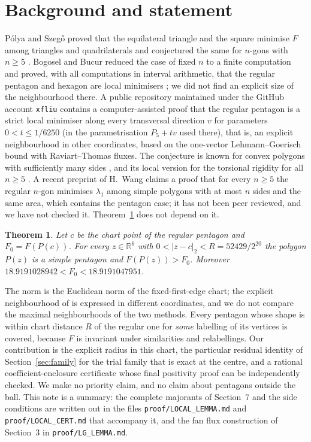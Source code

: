 \documentclass[11pt]{article}
\newtheorem{theorem}{Theorem}
\theoremstyle{remark}
\newcommand{\R}{\mathbb{R}}
\begin{document}
\section{Background and statement}
P\'olya and Szeg\H{o} proved that the equilateral triangle and the square minimise $F$ among triangles and
quadrilaterals and conjectured the same for $n$-gons with $n\ge5$ \cite{ps}. Bogosel and Bucur reduced the case of
fixed $n$ to a finite computation \cite{bb-jep} and proved, with all computations in interval arithmetic, that the
regular pentagon and hexagon are local minimisers \cite{bb-val}; we did not find an explicit size of the
neighbourhood there. A public repository maintained under the GitHub account
\texttt{xfliu} \cite{liu} contains a computer-assisted proof that the regular pentagon is a strict local minimiser
along every transversal direction $v$ for parameters $0<t\le 1/6250$ (in the parametrisation $P_5+tv$ used there),
that is, an explicit neighbourhood in other coordinates, based on the one-vector Lehmann--Goerisch bound with Raviart--Thomas fluxes. The conjecture is known for convex
polygons with sufficiently many sides \cite{cghl}, and its local version for the torsional rigidity for all $n\ge5$
\cite{bbf}. A recent preprint of H.~Wang \cite{wang} claims a proof that for every $n\ge5$ the regular $n$-gon
minimises $\lambda_1$ among simple polygons with at most $n$ sides and the same area, which contains the pentagon case;
it has not been peer reviewed, and we have not checked it. Theorem~\ref{thm:L} does not depend on it.

\begin{theorem}\label{thm:L}
Let $c$ be the chart point of the regular pentagon and $F_0=F(P(c))$. For every $z\in\R^6$ with
$0<|z-c|_2<R=52429/2^{20}$ the polygon $P(z)$ is a simple pentagon and $F(P(z))>F_0$. Moreover
$18.9191028942<F_0<18.9191047951$.
\end{theorem}
The norm is the Euclidean norm of the fixed-first-edge chart; the explicit neighbourhood of \cite{liu} is expressed
in different coordinates, and we do not compare the maximal neighbourhoods of the two methods. Every pentagon whose shape is within chart distance $R$ of the regular
one for \emph{some} labelling of its vertices is covered, because $F$ is invariant under similarities and relabellings.
Our contribution is the explicit radius in this chart, the particular residual identity of Section~\ref{sec:family}
for the trial family that is exact at the centre, and a rational coefficient-enclosure certificate whose final
positivity proof can be independently checked. We make no priority claim, and no claim about pentagons outside the
ball. This note is a summary: the complete majorants of Section~7 and the side conditions are written out in the
files \texttt{proof/LOCAL\_LEMMA.md} and \texttt{proof/LOCAL\_CERT.md} that accompany it, and the fan flux
construction of Section~3 in \texttt{proof/LG\_LEMMA.md}.
\end{document}
